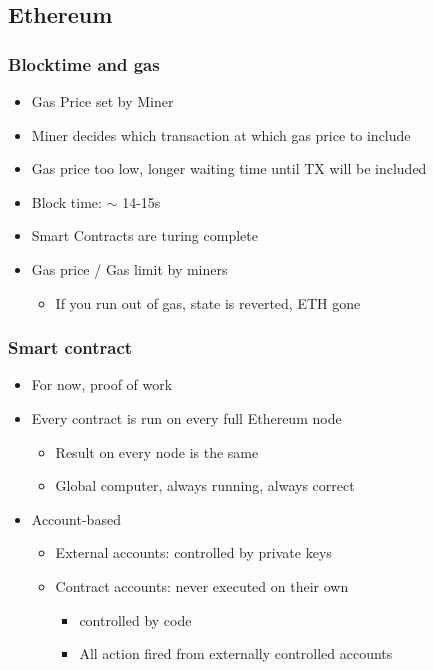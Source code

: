 \subsection{Ethereum}
\subsubsection{Blocktime and gas}
\begin{itemize}
    \item Gas Price set by Miner
    \item Miner decides which transaction at which gas price to include
    \item Gas price too low, longer waiting time until TX will be included
    \item Block time: $\sim$ 14-15s
    \item Smart Contracts are turing complete
    \item Gas price / Gas limit by miners
    \begin{itemize}
        \item If you run out of gas, state is reverted, ETH gone
    \end{itemize}
\end{itemize}

\subsubsection{Smart contract}
\begin{itemize}
    \item For now, proof of work
    \item Every contract is run on every full Ethereum node
    \begin{itemize}
        \item Result on every node is the same
        \item Global computer, always running, always correct
    \end{itemize}
    \item Account-based
    \begin{itemize}
        \item External accounts: controlled by private keys
        \item Contract accounts: never executed on their own
        \begin{itemize}
            \item controlled by code
            \item All action fired from externally controlled accounts
        \end{itemize}
    \end{itemize}
\end{itemize}

